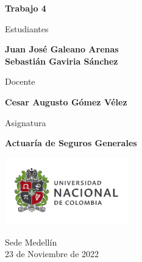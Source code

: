 \begin{titlepage}
   \Large{
   \begin{center}
       \vspace*{1cm}

       \textbf{Trabajo 4}

            
       \vspace{1.5cm}
       
       Estudiantes
       
       \vspace{0.5cm}
        
	\textbf{Juan José Galeano Arenas} \\

	\textbf{Sebastián Gaviria Sánchez}

              \vspace{1cm}
       
       Docente
       
       \vspace{0.5cm}

       \textbf{Cesar Augusto Gómez Vélez}
       
       \vspace{0.4cm}

       \vspace{1.4cm}
       
       Asignatura
       
       \vspace{0.5cm}

       \textbf{Actuaría de Seguros Generales}

       \vfill

            
       \vspace{0.4cm}
     
       \includegraphics[width=0.4\textwidth]{logounal.png}
            
       Sede Medellín\\
       23 de Noviembre de 2022
       
   \end{center}
   }
\end{titlepage}